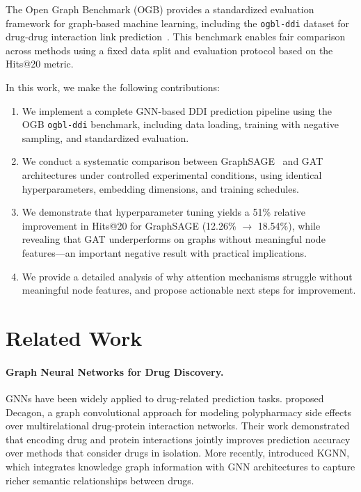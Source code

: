 \documentclass{article}
\begin{document}
The Open Graph Benchmark (OGB) provides a standardized evaluation framework for graph-based machine learning, including the \texttt{ogbl-ddi} dataset for drug-drug interaction link prediction~\citep{hu2020open}. This benchmark enables fair comparison across methods using a fixed data split and evaluation protocol based on the Hits@20 metric.

In this work, we make the following contributions:
\begin{enumerate}
    \item We implement a complete GNN-based DDI prediction pipeline using the OGB \texttt{ogbl-ddi} benchmark, including data loading, training with negative sampling, and standardized evaluation.
    \item We conduct a systematic comparison between GraphSAGE~\citep{hamilton2017inductive} and GAT~\citep{velickovic2018graph} architectures under controlled experimental conditions, using identical hyperparameters, embedding dimensions, and training schedules.
    \item We demonstrate that hyperparameter tuning yields a 51\% relative improvement in Hits@20 for GraphSAGE (12.26\% $\rightarrow$ 18.54\%), while revealing that GAT underperforms on graphs without meaningful node features---an important negative result with practical implications.
    \item We provide a detailed analysis of why attention mechanisms struggle without meaningful node features, and propose actionable next steps for improvement.
\end{enumerate}


\section{Related Work}

\paragraph{Graph Neural Networks for Drug Discovery.}
GNNs have been widely applied to drug-related prediction tasks. \citet{zitnik2018modeling} proposed Decagon, a graph convolutional approach for modeling polypharmacy side effects over multirelational drug-protein interaction networks. Their work demonstrated that encoding drug and protein interactions jointly improves prediction accuracy over methods that consider drugs in isolation. More recently, \citet{lin2020kgnn} introduced KGNN, which integrates knowledge graph information with GNN architectures to capture richer semantic relationships between drugs.
\end{document}
